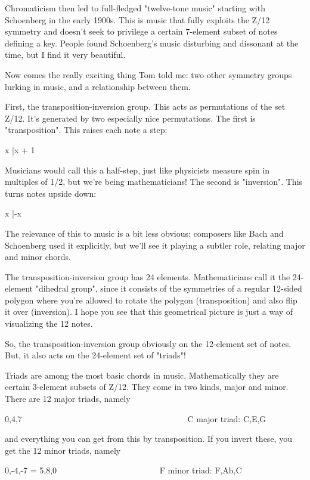 Chromaticism then led to full-fledged "twelve-tone music" 
starting with Schoenberg in the early 1900s.  This is music 
that fully exploits the Z/12 symmetry and doesn't seek to 
privilege a certain 7-element subset of notes defining a key.  
People found Schoenberg's music disturbing and dissonant at 
the time, but I find it very beautiful.  

Now comes the really exciting thing Tom told me: two other 
symmetry groups lurking in music, and a relationship between them.

First, the transposition-inversion group.  This acts as
permutations of the set Z/12.  It's generated by two 
especially nice permutations.  The first is "transposition".
This raises each note a step:
 
x |\to  x + 1 

Musicians would call this a half-step, just like physicists
measure spin in multiples of 1/2, but we're being mathematicians!
The second is "inversion".  This turns notes upside down:

x |\to  -x

The relevance of this to music is a bit less obvious: composers
like Bach and Schoenberg used it explicitly, but we'll see it
playing a subtler role, relating major and minor chords.

The transposition-inversion group has 24 elements.  Mathematicians 
call it the 24-element "dihedral group", since it consists of the 
symmetries of a regular 12-sided polygon where you're allowed 
to rotate the polygon (transposition) and also flip it over 
(inversion).  I hope you see that this geometrical picture is 
just a way of visualizing the 12 notes.

So, the transposition-inversion group obviously on the 12-element
set of notes.  But, it also acts on the 24-element set of "triads"!  

Triads are among the most basic chords in music.  Mathematically 
they are certain 3-element subsets of Z/12.   They come in two 
kinds, major and minor.  There are 12 major triads, namely 

{0,4,7}   
\ \ \ \ \ \ \ \ \ \ \ \       
\ \ \ \ \ \ \ \ \ \ \ \       
\ \ \ \ \ \ \ \ \ \ \ \       
\ \ \ 
     C major triad: {C,E,G}

and everything you can get from this by transposition.  If you 
invert these, you get the 12 minor triads, namely

{0,-4,-7} = {5,8,0}                   
\ \ \ \ \ \ \ \ \ \ \ \       
\ \ \ \ \ \ \ \ \ \ \ \       
   F minor triad: {F,Ab,C}

